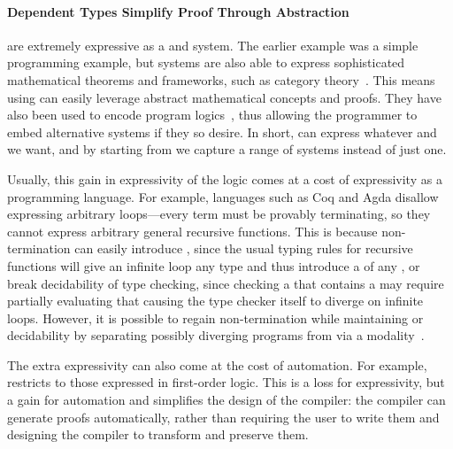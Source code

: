 \paragraph{Dependent Types Simplify Proof Through Abstraction}
 are extremely expressive as a  and
 system.
%
The earlier example was a simple programming example, but 
systems are also able to express sophisticated mathematical theorems and
frameworks, such as category theory~\cite{gross2014,timany2015}.
This means  using  can easily
leverage abstract mathematical concepts and proofs.
They have also been used to encode program
logics~\cite{nanevski2008,krebbers2017}, thus allowing the programmer to embed
alternative  systems if they so desire.
In short,  can express whatever  and
 we want, and by starting from  we capture a
range of  systems instead of just one.

Usually, this gain in expressivity of the logic comes at a cost of expressivity
as a programming language.
For example,  languages such as Coq and Agda disallow
expressing arbitrary loops---every term must be provably terminating, so they
cannot express arbitrary general recursive functions.
This is because non-termination can easily introduce , since the
usual typing rules for recursive functions will give an infinite loop any type
and thus introduce a  of any ,
or break decidability of type checking, since checking a  that
contains a  may require partially evaluating that  causing
the type checker itself to diverge on infinite loops.
However, it is possible to regain non-termination while maintaining
 or decidability by separating possibly diverging
programs from  via a
modality~\cite{jia2010,casinghino2014,nanevski2006:htt,nanevski2005:htt,swamy2013:f*-jfp}.

The extra expressivity can also come at the cost of automation.
For example, \citet{necula1997} restricts  to those
expressed in first-order logic.
This is a loss for expressivity, but a gain for automation and simplifies the
design of the compiler: the compiler can generate proofs automatically, rather
than requiring the user to write them and designing the compiler to transform
and preserve them.

